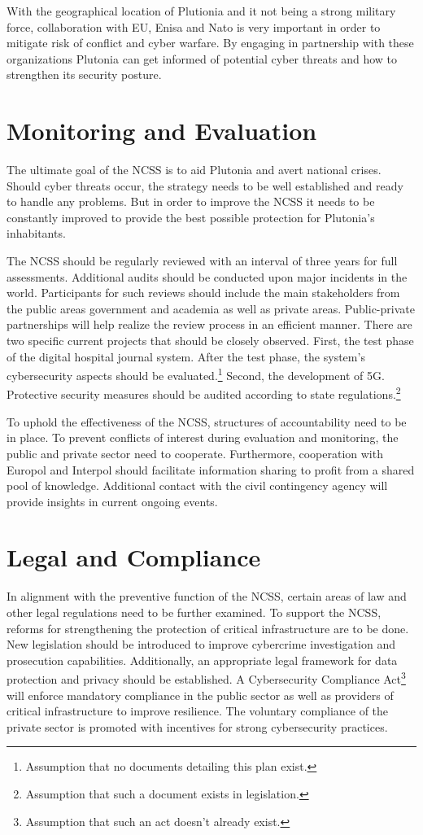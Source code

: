 \documentclass[
	a4paper, %
	10pt, %
]{CSSullivanBusinessReport}
\begin{document}
\begin{fullwidth}
\begin{justify}
With the geographical location of Plutionia and it not being a strong military force, collaboration with EU, Enisa and Nato is very important in order to mitigate risk of conflict and cyber warfare. By engaging in partnership with these organizations Plutonia can get informed of potential cyber threats and how to strengthen its security posture. 

\section{Monitoring and Evaluation}
The ultimate goal of the NCSS is to aid Plutonia and avert national crises. Should cyber threats occur, the strategy needs to be well established and ready to handle any problems. But in order to improve the NCSS it needs to be constantly improved to provide the best possible protection for Plutonia's inhabitants.

The NCSS should be regularly reviewed with an interval of three years for full assessments. Additional audits should be conducted upon major incidents in the world. Participants for such reviews should include the main stakeholders from the public areas government and academia as well as private areas. Public-private partnerships will help realize the review process in an efficient manner. There are two specific current projects that should be closely observed. First, the test phase of the digital hospital journal system. After the test phase, the system’s cybersecurity aspects should be evaluated.\footnote{Assumption that no documents detailing this plan exist. } Second, the development of 5G. Protective security measures should be audited according to state regulations.\footnote{Assumption that such a document exists in legislation.}

To uphold the effectiveness of the NCSS, structures of accountability need to be in place. To prevent conflicts of interest during evaluation and monitoring, the public and private sector need to cooperate. Furthermore, cooperation with Europol and Interpol should facilitate information sharing to profit from a shared pool of knowledge. Additional contact with the civil contingency agency will provide insights in current ongoing events.


\section{Legal and Compliance}
In alignment with the preventive function of the NCSS, certain areas of law and other legal regulations need to be further examined. To support the NCSS, reforms for strengthening the protection of critical infrastructure are to be done. New legislation should be introduced to improve cybercrime investigation and prosecution capabilities. Additionally, an appropriate legal framework for data protection and privacy should be established. A Cybersecurity Compliance Act\footnote{Assumption that such an act doesn’t already exist.} will enforce mandatory compliance in the public sector as well as providers of critical infrastructure to improve resilience. The voluntary compliance of the private sector is promoted with incentives for strong cybersecurity practices.


\end{justify}
\end{fullwidth}
\end{document}
